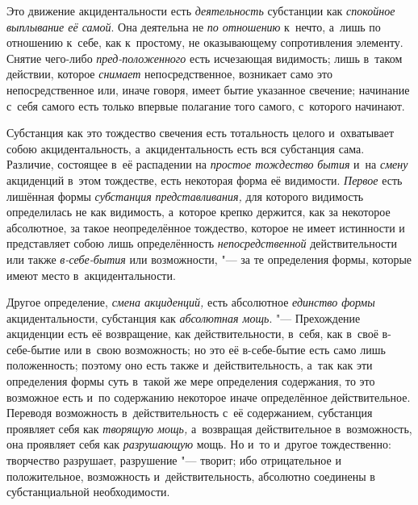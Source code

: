 Это движение акцидентальности есть {\em деятельность}
субстанции как {\em спокойное выплывание её самой}. Она
деятельна не {\em по отношению} к~нечто, а~лишь по
отношению к~себе, как к~простому, не оказывающему сопротивления элементу.
Снятие чего-либо {\em пред-положенного} есть исчезающая
видимость; лишь в~таком действии, которое {\em снимает}
непосредственное, возникает само это непосредственное или, иначе говоря,
имеет бытие указанное свечение; начинание с~себя самого есть только впервые
полагание того самого, с~которого начинают.

Субстанция как это тождество свечения есть тотальность целого и~охватывает
собою акцидентальность, а~акцидентальность есть вся субстанция сама.
Различие, состоящее в~её распадении на {\em простое
тождество} {\em бытия} и~на
{\em смену} акциденций в~этом тождестве, есть некоторая
форма её видимости. {\em Первое} есть лишённая формы
{\em субстанция}
{\em представливания,} для которого видимость
определилась не как видимость, а~которое крепко держится, как за некоторое
абсолютное, за такое неопределённое тождество, которое не имеет истинности
и представляет собою лишь определённость
{\em непосредственной} действительности или также
{\em в-себе-бытия} или возможности, "--- за те определения
формы, которые имеют место в~акцидентальности.

Другое определение, {\em смена акциденций,} есть
абсолютное {\em единство формы} акцидентальности,
субстанция как {\em абсолютная мощь}. "--- Прехождение
акциденции есть её возвращение, как действительности, в~себя, как в~своё
в-себе-бытие или в~свою возможность; но это её в-себе-бытие есть само лишь
положенность; поэтому оно есть также и~действительность, а~так как эти
определения формы суть в~такой же мере определения содержания, то это
возможное есть и~по содержанию некоторое иначе определённое действительное.
Переводя возможность в~действительность с~её содержанием, субстанция
проявляет себя как {\em творящую мощь,} а~возвращая
действительное в~возможность, она проявляет себя как
{\em разрушающую} мощь. Но и~то и~другое тождественно:
творчество разрушает, разрушение "--- творит; ибо отрицательное и
положительное, возможность и~действительность, абсолютно соединены в
субстанциальной необходимости.

